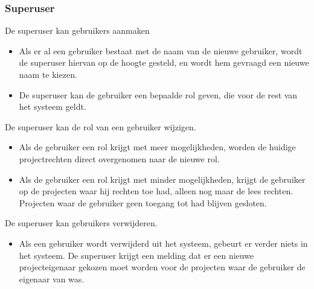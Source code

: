 \subsubsection{Superuser}

De superuser kan gebruikers aanmaken
\begin{itemize}
	\item Als er al een gebruiker bestaat met de naam van de nieuwe gebruiker, wordt de superuser hiervan op de hoogte gesteld, en wordt hem gevraagd een nieuwe naam te kiezen.
	\item De superuser kan de gebruiker een bepaalde rol geven, die voor de rest van het systeem geldt.
\end{itemize}

De superuser kan de rol van een gebruiker wijzigen.
\begin{itemize}
	\item Als de gebruiker een rol krijgt met meer mogelijkheden, worden de huidige projectrechten direct overgenomen naar de nieuwe rol.
	\item Als de gebruiker een rol krijgt met minder mogelijkheden, krijgt de gebruiker op de projecten waar hij rechten toe had, alleen nog maar de lees rechten. Projecten waar de gebruiker geen toegang tot had blijven gesloten.
\end{itemize}

De superuser kan gebruikers verwijderen.
\begin{itemize}
	\item Als een gebruiker wordt verwijderd uit het systeem, gebeurt er verder niets in het systeem. De superuser krijgt een melding dat er een nieuwe projecteigenaar gekozen moet worden voor de projecten waar de gebruiker de eigenaar van was.
\end{itemize}
